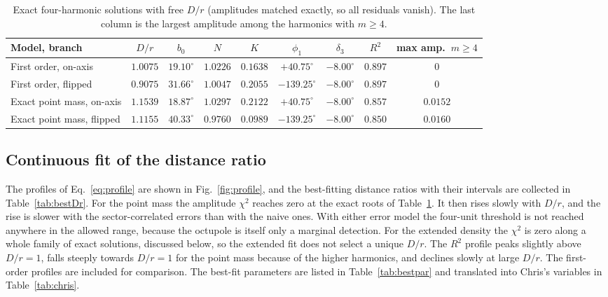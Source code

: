 \documentclass[10pt]{article}
\begin{document}
\begin{table}[!htb]\centering\small
\caption{Exact four-harmonic solutions with free $D/r$ (amplitudes matched exactly, so all residuals vanish). The last column is the largest amplitude among the harmonics with $m\ge4$.}\label{tab:free}
\begin{tabular}{lcccccccc}\toprule
Model, branch & $D/r$ & $b_0$ & $N$ & $K$ & $\phi_1$ & $\delta_3$ & $R^2$ & max amp.\ $m\ge4$\\\midrule

First order, on-axis & $1.0075$ & $19.10^\circ$ & $1.0226$ & $0.1638$ & $+40.75^\circ$ & $-8.00^\circ$ & $0.897$ & $0$\\
First order, flipped & $0.9075$ & $31.66^\circ$ & $1.0047$ & $0.2055$ & $-139.25^\circ$ & $-8.00^\circ$ & $0.897$ & $0$\\
Exact point mass, on-axis & $1.1539$ & $18.87^\circ$ & $1.0297$ & $0.2122$ & $+40.75^\circ$ & $-8.00^\circ$ & $0.857$ & $0.0152$\\
Exact point mass, flipped & $1.1155$ & $40.33^\circ$ & $0.9760$ & $0.0989$ & $-139.25^\circ$ & $-8.00^\circ$ & $0.850$ & $0.0160$\\
\bottomrule
\end{tabular}
\end{table}


\subsection{Continuous fit of the distance ratio}
The profiles of Eq.~\eqref{eq:profile} are shown in Fig.~\ref{fig:profile}, and the best-fitting distance ratios with their intervals are collected in Table~\ref{tab:bestDr}. For the point mass the amplitude $\chi^2$ reaches zero at the exact roots of Table~\ref{tab:free}. It then rises slowly with $D/r$, and the rise is slower with the sector-correlated errors than with the naive ones. With either error model the four-unit threshold is not reached anywhere in the allowed range, because the octupole is itself only a marginal detection. For the extended density the $\chi^2$ is zero along a whole family of exact solutions, discussed below, so the extended fit does not select a unique $D/r$. The $R^2$ profile peaks slightly above $D/r=1$, falls steeply towards $D/r=1$ for the point mass because of the higher harmonics, and declines slowly at large $D/r$. The first-order profiles are included for comparison. The best-fit parameters are listed in Table~\ref{tab:bestpar} and translated into Chris's variables in Table~\ref{tab:chris}.
\end{document}
